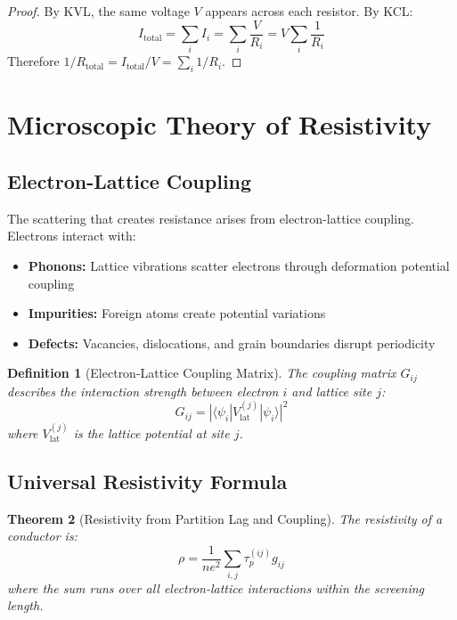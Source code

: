 \documentclass[twocolumn,showpacs,preprintnumbers,amsmath,amssymb,prd]{revtex4-2}
\newtheorem{theorem}{Theorem}[section]
\newtheorem{definition}[theorem]{Definition}
\newcommand{\taup}{\tau_p}
\begin{document}
\begin{proof}
By KVL, the same voltage $V$ appears across each resistor. By KCL:
\begin{equation}
I_{\text{total}} = \sum_i I_i = \sum_i \frac{V}{R_i} = V\sum_i \frac{1}{R_i}
\end{equation}
Therefore $1/R_{\text{total}} = I_{\text{total}}/V = \sum_i 1/R_i$.
\end{proof}


\section{Microscopic Theory of Resistivity}
\label{sec:resistivity}

\subsection{Electron-Lattice Coupling}

The scattering that creates resistance arises from electron-lattice coupling. Electrons interact with:
\begin{itemize}
\item \textbf{Phonons:} Lattice vibrations scatter electrons through deformation potential coupling
\item \textbf{Impurities:} Foreign atoms create potential variations
\item \textbf{Defects:} Vacancies, dislocations, and grain boundaries disrupt periodicity
\end{itemize}

\begin{definition}[Electron-Lattice Coupling Matrix]
\label{def:coupling_matrix}
The coupling matrix $G_{ij}$ describes the interaction strength between electron $i$ and lattice site $j$:
\begin{equation}
G_{ij} = |\langle \psi_i | V_{\text{lat}}^{(j)} | \psi_i \rangle|^2
\label{eq:coupling_matrix}
\end{equation}
where $V_{\text{lat}}^{(j)}$ is the lattice potential at site $j$.
\end{definition}

\subsection{Universal Resistivity Formula}

\begin{theorem}[Resistivity from Partition Lag and Coupling]
\label{thm:resistivity_universal}
The resistivity of a conductor is:
\begin{equation}
\rho = \frac{1}{ne^2} \sum_{i,j} \taup^{(ij)} g_{ij}
\label{eq:resistivity_universal}
\end{equation}
where the sum runs over all electron-lattice interactions within the screening length.
\end{theorem}
\end{document}
